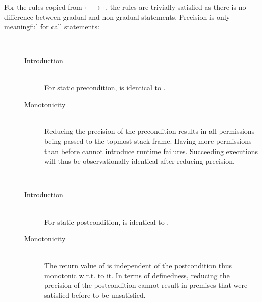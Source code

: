 \begin{proofatend}
    For the rules copied from ${\cdot} \,\,{\longrightarrow^{}}\,\, {\cdot}$, the rules are trivially satisfied as there is no difference between gradual and non-gradual statements.
    Precision is only meaningful for call statements:
    
    \begin{description}
        \item[]~
        \begin{description}
            \item[Introduction]~\\
            For static precondition,  is identical to .
            
            \item[Monotonicity]~\\
            Reducing the precision of the precondition results in all permissions being passed to the topmost stack frame.
            Having more permissions than before cannot introduce runtime failures.
            Succeeding executions will thus be observationally identical after reducing precision.
        \end{description}
        
        \item[]~
        \begin{description}
            \item[Introduction]~\\
            For static postcondition,  is identical to .
            
            \item[Monotonicity]~\\
            The return value of  is independent of the postcondition thus monotonic w.r.t. to it.
            In terms of definedness, reducing the precision of the postcondition cannot result in premises that were satisfied before to be unsatisfied.
        \end{description}
    \end{description}
\end{proofatend}

